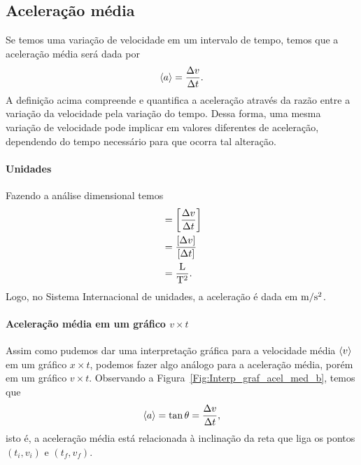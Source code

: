 \subsection{Aceleração média}

Se temos uma variação de velocidade em um intervalo de tempo, temos que a aceleração média será dada por
\begin{equation}
  \left\langle{a}\right\rangle = \frac{\Delta v}{\Delta t}.
\end{equation}
%
A definição acima compreende e quantifica a aceleração através da razão entre a variação da velocidade pela variação do tempo. Dessa forma, uma mesma variação de velocidade pode implicar em valores diferentes de aceleração, dependendo do tempo necessário para que ocorra tal alteração.

\paragraph{Unidades}

Fazendo a análise dimensional temos
\begin{align}
	[\mean{a}] &= \left[\frac{\Delta v}{\Delta t}\right] \\
		&= \frac{[\Delta v]}{[\Delta t]} \\
		&= \frac{\rm{L}}{\rm{T}^2}.
\end{align}
%
Logo, no Sistema Internacional de unidades, a aceleração é dada em $\rm{m}/\rm{s}^2$.

\paragraph{Aceleração média em um gráfico $v \times t$}

Assim como pudemos dar uma interpretação gráfica para a velocidade média $\left\langle{v}\right\rangle$ em um gráfico $x \times t$, podemos fazer algo análogo para a aceleração média, porém em um gráfico $v \times t$. Observando a Figura~\ref{Fig:Interp_graf_acel_med_b}, temos que
\begin{equation}
	\left\langle{a}\right\rangle = \tan \theta = \frac{\Delta v}{\Delta t},
\end{equation}
%
isto é, a aceleração média está relacionada à inclinação da reta que liga os pontos $(t_i, v_i)$ e $(t_f, v_f)$.

